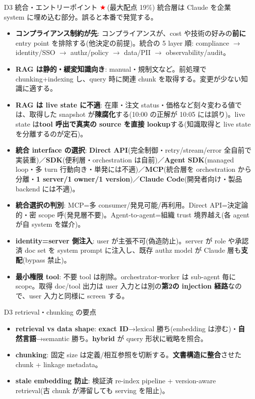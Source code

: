 \documentclass[10pt,a4paper]{article}
\newcommand{\R}[1]{\textcolor{cred}{\textbf{#1}}}
\newcommand{\B}[1]{\textcolor{cblue}{\textbf{#1}}}
\newcommand{\stc}{\textcolor{red}{\ensuremath{\bigstar}}\,}
\begin{document}
\vspace{1pt}
\noindent
\begin{minipage}[t]{0.333\textwidth}

\begin{boxblue}{D3 統合・エントリーポイント \stc (最大配点 19\%)}
統合層は Claude を企業 system に埋め込む部分。誤ると本番で発覚する。
\begin{itemize}
\item \R{コンプライアンス制約が先}: コンプライアンスが、cost や技術の好みの\R{前に} entry point を排除する(他決定の前提)。統合の 5 layer 順: compliance $\to$ identity/SSO $\to$ authz/policy $\to$ data/PII $\to$ observability/audit。
\item \R{RAG は静的・緩変知識向き}: manual・規制文など。前処理で chunking+indexing し、query 時に関連 chunk を取得する。変更が少ない知識に適する。
\item \R{RAG は live state に不適}: 在庫・注文 status・価格など刻々変わる値では、取得した snapshot が\B{陳腐化}する(10:00 の正解が 10:05 には誤り)。live state は\B{tool 呼出で真実の source を直接 lookup}する(知識取得と live state を分離するのが定石)。
\item \R{統合 interface の選択}: \B{Direct API}(完全制御・retry/stream/error 全自前で実装重)／\B{SDK}(便利層・orchestration は自前)／\B{Agent SDK}(managed loop・多 turn 行動向き・単発には不適)／\B{MCP}(統合層を orchestration から分離・\B{1 server/1 owner/1 version})／\B{Claude Code}(開発者向け・製品 backend には不適)。
\item \R{統合選択の判別}: MCP=多 consumer/発見可能/再利用。Direct API=決定論的・密 scope 呼(発見層不要)。Agent-to-agent=組織 trust 境界越え(各 agent が自 system を媒介)。
\item \R{identity=server 側注入}: user が主張不可(偽造防止)。server が role や承認済 doc set を system prompt に注入し、既存 authz model が Claude 層も\B{支配}(bypass 禁止)。
\item \R{最小権限 tool}: 不要 tool は削除。orchestrator-worker は sub-agent 毎に scope。取得 doc/tool 出力は user 入力とは別の\B{第2の injection 経路}なので、user 入力と同様に screen する。
\end{itemize}
\end{boxblue}

\begin{boxblue}{D3 retrieval・chunking の要点}
\begin{itemize}
\item \R{retrieval vs data shape}: \B{exact ID}→lexical 勝ち(embedding は滲む)・\B{自然言語}→semantic 勝ち。\B{hybrid} が query 形状に戦略を照合。
\item \R{chunking}: 固定 size は定義/相互参照を切断する。\B{文書構造に整合}させた chunk + linkage metadata。
\item \R{stale embedding 防止}: 検証済 re-index pipeline + version-aware retrieval(古 chunk が滞留しても serving を阻止)。
\end{itemize}
\end{boxblue}

\end{minipage}\hfill
\end{document}
